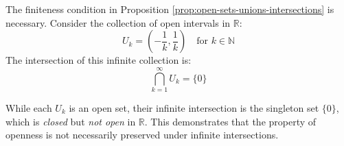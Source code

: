 \begin{math-stroke}
\setcounter{theorem}{44}
\begin{example}\label{ex:infinite-intersection-open}
The finiteness condition in Proposition \ref{prop:open-sets-unions-intersections} is necessary. Consider the collection of open intervals in $\mathbb{R}$:
\[ U_k = \left( -\frac{1}{k}, \frac{1}{k} \right) \quad \text{for } k \in \mathbb{N} \]
The intersection of this infinite collection is:
\[ \bigcap_{k=1}^\infty U_k = \{ 0 \} \]
\begin{center}
\end{center}
\begin{explanation-of-steps}
While each $U_k$ is an open set, their infinite intersection is the singleton set $\{0\}$, which is \emph{closed} but \emph{not open} in $\mathbb{R}$. This demonstrates that the property of openness is not necessarily preserved under infinite intersections.
\end{explanation-of-steps}
\end{example}
\end{math-stroke}

